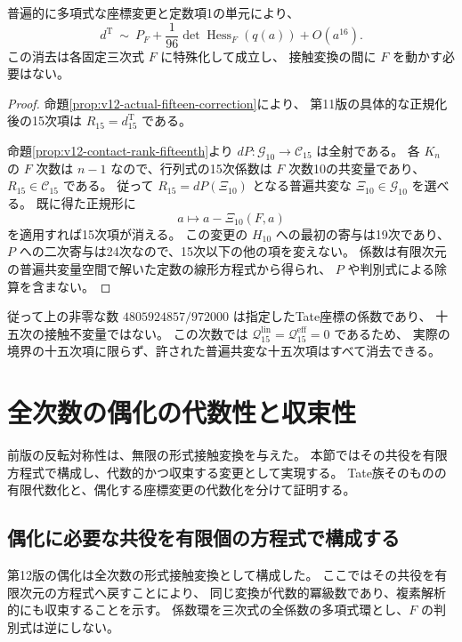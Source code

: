 \begin{theorem}[実際の境界の十五次までの普遍正規形]
\label{thm:v12-fifteenth-normal-form}
普遍的に多項式な座標変更と定数項1の単元により、
\[
 \boxed{\displaystyle
 d^{\mathrm T}\ \sim\
 P_F+\frac1{96}\det\operatorname{Hess}_F(q(a))+O(a^{16}).}
\]
この消去は各固定三次式 $F$ に特殊化して成立し、
接触変換の間に $F$ を動かす必要はない。
\end{theorem}

\begin{proof}
命題\ref{prop:v12-actual-fifteen-correction}により、
第11版の具体的な正規化後の15次項は $R_{15}=d^{\mathrm T}_{15}$ である。

命題\ref{prop:v12-contact-rank-fifteenth}より
$dP:\mathcal G_{10}\to\mathcal C_{15}$ は全射である。
各 $K_n$ の $F$ 次数は $n-1$ なので、行列式の15次係数は
$F$ 次数10の共変量であり、$R_{15}\in\mathcal C_{15}$ である。
従って $R_{15}=dP(\Xi_{10})$ となる普遍共変な
$\Xi_{10}\in\mathcal G_{10}$ を選べる。
既に得た正規形に
\[
 a\longmapsto a-\Xi_{10}(F,a)
\]
を適用すれば15次項が消える。
この変更の $H_{10}$ への最初の寄与は19次であり、
$P$ への二次寄与は24次なので、15次以下の他の項を変えない。
係数は有限次元の普遍共変量空間で解いた定数の線形方程式から得られ、
$P$ や判別式による除算を含まない。
\end{proof}

従って上の非零な数
$4805924857/972000$ は指定したTate座標の係数であり、
十五次の接触不変量ではない。
この次数では $\mathcal Q^{\mathrm{lin}}_{15}
=\mathcal Q^{\mathrm{eff}}_{15}=0$ であるため、
実際の境界の十五次項に限らず、許された普遍共変な十五次項はすべて消去できる。


\clearpage
\section{全次数の偶化の代数性と収束性}
\label{sec:algebraic-parity}

前版の反転対称性は、無限の形式接触変換を与えた。
本節ではその共役を有限方程式で構成し、代数的かつ収束する変更として実現する。
Tate族そのものの有限代数化と、偶化する座標変更の代数化を分けて証明する。


\subsection{偶化に必要な共役を有限個の方程式で構成する}
\label{subsec:v13-algebraic-parity}

第12版の偶化は全次数の形式接触変換として構成した。
ここではその共役を有限次元の方程式へ戻すことにより、
同じ変換が代数的冪級数であり、複素解析的にも収束することを示す。
係数環を三次式の全係数の多項式環とし、$F$ の判別式は逆にしない。

